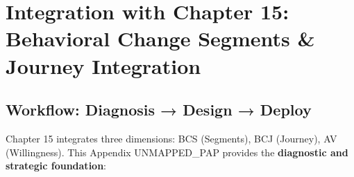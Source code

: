 \documentclass[11pt, a4paper]{article}
\begin{document}

\section{Integration with Chapter 15: Behavioral Change Segments \& Journey Integration}

\subsection{Workflow: Diagnosis → Design → Deploy}

Chapter 15 integrates three dimensions: BCS (Segments), BCJ (Journey), AV (Willingness).
This Appendix UNMAPPED_PAP provides the \textbf{diagnostic and strategic foundation}:
\end{document}
